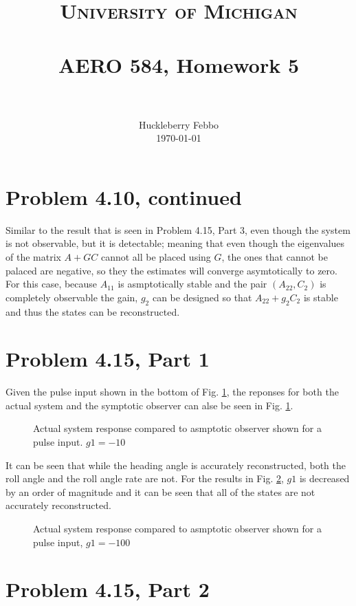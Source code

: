 \documentclass[paper=a4, fontsize=11pt]{scrartcl}
\title{
		\usefont{OT1}{bch}{b}{n}
		\normalfont \normalsize \textsc{University of Michigan} \\ [25pt]
		\horrule{0.5pt} \\[0.4cm]
		\huge AERO 584, Homework  5 \\
		\horrule{2pt} \\[0.5cm]
}
\author{
		\normalfont 								\normalsize
         Huckleberry Febbo\\[-3pt]		\normalsize
        \today
}
\date{}
\numberwithin{equation}{section}		%
\numberwithin{figure}{section}			%
\numberwithin{table}{section}				%
\begin{document}
\maketitle



\section*{Problem 4.10, continued}

Similar to the result that is seen in Problem 4.15, Part 3, even though the system is not observable, but it is detectable; meaning that even though the eigenvalues of the matrix $A+GC$ cannot all be placed using $G$, the ones that cannot be palaced are negative, so they the estimates will converge asymtotically to zero. For this case, because $A_11$ is asmptotically stable and the pair $(A_{22},C_2)$ is completely observable the gain, $g_2$ can be designed so that $A_{22} + g_2C_2$ is stable and thus the states can be reconstructed.

\section*{Problem 4.15, Part 1}



Given the pulse input shown in the bottom of Fig. \ref{fig:f1}, the reponses for both the actual system and the symptotic observer can alse be seen in Fig. \ref{fig:f1}. 

\begin{figure}[!htb]
	\centering
    
	\caption{Actual system response compared to asmptotic observer shown for a pulse input. $g1= -10$\label{fig:f1}}
\end{figure}
It can be seen that while the heading angle is accurately reconstructed, both the roll angle and the roll angle rate are not. For the results in Fig. \ref{fig:f2}, $g1$ is decreased by an order of magnitude and it can be seen that all of the states are not accurately reconstructed.
\begin{figure}[ht]
	\centering
    
	\caption{Actual system response compared to asmptotic observer shown for a pulse input, $g1 = -100$ \label{fig:f2}}
\end{figure}



\section*{Problem 4.15, Part 2}
\end{document}
